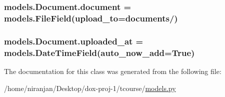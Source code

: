 \subsubsection[{\texorpdfstring{document}{document}}]{\setlength{\rightskip}{0pt plus 5cm}models.\+Document.\+document = models.\+File\+Field(upload\+\_\+to=\textquotesingle{}documents/\textquotesingle{})\hspace{0.3cm}{\ttfamily [static]}}\hypertarget{classmodels_1_1_document_a909e4c96d52c0e135844e3da24d58ee6}{}\label{classmodels_1_1_document_a909e4c96d52c0e135844e3da24d58ee6}
\subsubsection[{\texorpdfstring{uploaded\+\_\+at}{uploaded_at}}]{\setlength{\rightskip}{0pt plus 5cm}models.\+Document.\+uploaded\+\_\+at = models.\+Date\+Time\+Field(auto\+\_\+now\+\_\+add=True)\hspace{0.3cm}{\ttfamily [static]}}\hypertarget{classmodels_1_1_document_ae51e1350a7de5df17e76ce487f816a8b}{}\label{classmodels_1_1_document_ae51e1350a7de5df17e76ce487f816a8b}


The documentation for this class was generated from the following file\+:\begin{DoxyCompactItemize}
\item 
/home/niranjan/\+Desktop/dox-\/proj-\/1/tcourse/\hyperlink{models_8py}{models.\+py}\end{DoxyCompactItemize}
